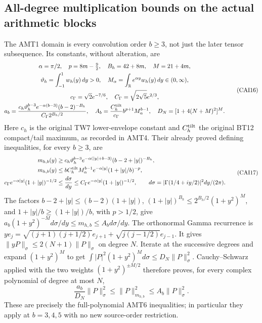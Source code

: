 \documentclass[11pt,a4paper]{article}
\begin{document}
\subsection{All-degree multiplication bounds on the actual arithmetic blocks}

The AMT1 domain is every convolution order $b\ge3$, not just the later
tensor subsequence. Its constants, without alteration, are
\[
\begin{gathered}
 \alpha=\pi/2,\quad p=8m-\tfrac92,\quad B_h=42+8m,\quad M=21+4m,\\
 \vartheta_h=\int_{-1}^1w_h(y)\,dy>0,\quad
 M_\alpha=\int_{\mathbb R}e^{\alpha y}w_h(y)\,dy\in(0,\infty),\\
 c_\Gamma=\sqrt2e^{-7/6},\quad C_\Gamma=\sqrt{2\sqrt5}e^{2/3},\\
 a_b=\frac{c_h\vartheta_h^{b-3}e^{-\alpha(b-3)}(b-2)^{-B_h}}
                   {C_\Gamma2^{B_h/2}},\quad
 A_b=\frac{C_h^{\rm tilt}}{c_\Gamma}b^{p+1}M_\alpha^{b-1},\quad
 D_N=[1+4(N+M)^2]^M.
\end{gathered}\tag{CAI16}
\]
Here $c_h$ is the original TW7 lower-envelope constant and
$C_h^{\rm tilt}$ the original BT12 compact/tail maximum, as recorded
in AMT4. Their already proved defining inequalities, for every $b\ge3$,
are
\[
\begin{aligned}
 m_{h,b}(y)&\ge c_h\vartheta_h^{b-3}
             e^{-\alpha(|y|+b-3)}(b-2+|y|)^{-B_h},\\
 m_{h,b}(y)&\le bC_h^{\rm tilt}M_\alpha^{b-1}
             e^{-\alpha|y|}(1+|y|/b)^{-p},\\
 c_\Gamma e^{-\alpha|y|}(1+|y|)^{-1/2}
 &\le \frac{d\sigma}{dy}\le
 C_\Gamma e^{-\alpha|y|}(1+|y|)^{-1/2},\qquad
 d\sigma=|\Gamma(1/4+iy/2)|^2dy/(2\pi).
\end{aligned}\tag{CAI17}
\]
The factors $b-2+|y|\le(b-2)(1+|y|)$,
$(1+|y|)^{B_h}\le2^{B_h/2}(1+y^2)^M$, and
$1+|y|/b\ge(1+|y|)/b$, with $p>1/2$, give
$a_b(1+y^2)^{-M}d\sigma/dy\le m_{h,b}\le A_b d\sigma/dy$.
The orthonormal Gamma recurrence is
$ye_j=\sqrt{(j+1)(j+1/2)}e_{j+1}+\sqrt{j(j-1/2)}e_{j-1}$.
It gives $\|yP\|_\sigma\le2(N+1)\|P\|_\sigma$ on degree $N$.
Iterate at the successive degrees and expand $(1+y^2)^M$ to get
$\int|P|^2(1+y^2)^M d\sigma\le D_N\|P\|_\sigma^2$.
Cauchy--Schwarz applied with the two weights $(1+y^2)^{\pm M/2}$
therefore proves, for every complex polynomial of degree at most $N$,
\[
 \frac{a_b}{D_N}\|P\|_\sigma^2\le\|P\|_{m_{h,b}}^2
                         \le A_b\|P\|_\sigma^2.\tag{CAI18}
\]
These are precisely the full-polynomial AMT6 inequalities; in particular
they apply at $b=3,4,5$ with no new source-order restriction.
\end{document}
